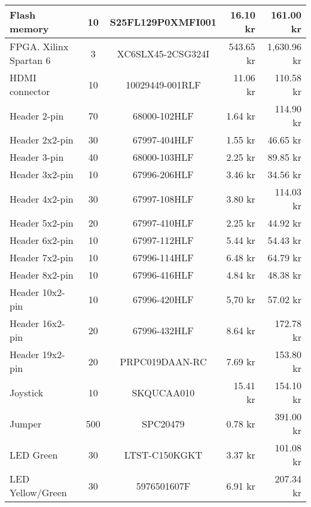 \begin{longtable}{|l|c|c|r|r|}
    Flash memory            & 10    & S25FL129P0XMFI001         & 16.10 kr   & 161.00 kr   \\ \hline
    FPGA. Xilinx Spartan 6  & 3     & XC6SLX45-2CSG324I	        & 543.65 kr  & 1,630.96 kr \\ \hline
    HDMI connector          & 10    & 10029449-001RLF	        & 11.06 kr   & 110.58 kr   \\ \hline
    Header 2-pin            & 70    & 68000-102HLF	            & 1.64 kr    & 114.90 kr   \\ \hline
    Header 2x2-pin          & 30    & 67997-404HLF	            & 1.55 kr    & 46.65 kr    \\ \hline
    Header 3-pin            & 40    & 68000-103HLF	            & 2.25 kr    & 89.85 kr    \\ \hline
    Header 3x2-pin          & 10    & 67996-206HLF	            & 3.46 kr    & 34.56 kr    \\ \hline
    Header 4x2-pin          & 30    & 67997-108HLF	            & 3.80 kr    & 114.03 kr   \\ \hline
    Header 5x2-pin          & 20    & 67997-410HLF	            & 2.25 kr    & 44.92 kr    \\ \hline
    Header 6x2-pin          & 10    & 67997-112HLF	            & 5.44 kr    & 54.43 kr    \\ \hline
    Header 7x2-pin          & 10    & 67996-114HLF	            & 6.48 kr    & 64.79 kr    \\ \hline
    Header 8x2-pin          & 10    & 67996-416HLF	            & 4.84 kr    & 48.38 kr    \\ \hline
    Header 10x2-pin         & 10    & 67996-420HLF	            & 5,70 kr    & 57.02 kr    \\ \hline
    Header 16x2-pin         & 20    & 67996-432HLF	            & 8.64 kr    & 172.78 kr   \\ \hline
    Header 19x2-pin         & 20    & PRPC019DAAN-RC	        & 7.69 kr    & 153.80 kr   \\ \hline
    Joystick                & 10    & SKQUCAA010                & 15.41 kr   & 154.10 kr   \\ \hline
    Jumper                  & 500   & SPC20479                  & 0.78 kr    & 391.00 kr   \\ \hline
    LED Green               & 30    & LTST-C150KGKT	            & 3.37 kr    & 101.08 kr   \\ \hline
    LED Yellow/Green        & 30    & 5976501607F               & 6.91 kr    & 207.34 kr   \\ \hline

\end{longtable}
